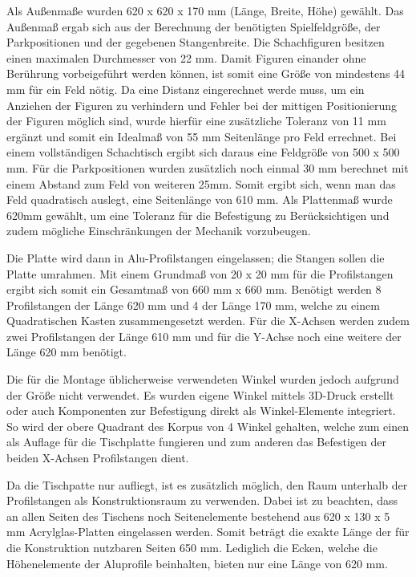 Als Außenmaße wurden 620 x 620 x 170 mm (Länge, Breite, Höhe) gewählt.
Das Außenmaß ergab sich aus der Berechnung der benötigten
Spielfeldgröße, der Parkpositionen und der gegebenen Stangenbreite. Die
Schachfiguren besitzen einen maximalen Durchmesser von 22 mm. Damit
Figuren einander ohne Berührung vorbeigeführt werden können, ist somit
eine Größe von mindestens 44 mm für ein Feld nötig. Da eine Distanz
eingerechnet werde muss, um ein Anziehen der Figuren zu verhindern und
Fehler bei der mittigen Positionierung der Figuren möglich sind, wurde
hierfür eine zusätzliche Toleranz von 11 mm ergänzt und somit ein
Idealmaß von 55 mm Seitenlänge pro Feld errechnet. Bei einem
vollständigen Schachtisch ergibt sich daraus eine Feldgröße von 500 x
500 mm. Für die Parkpositionen wurden zusätzlich noch einmal 30 mm
berechnet mit einem Abstand zum Feld von weiteren 25mm. Somit ergibt
sich, wenn man das Feld quadratisch auslegt, eine Seitenlänge von 610
mm. Als Plattenmaß wurde 620mm gewählt, um eine Toleranz für die
Befestigung zu Berücksichtigen und zudem mögliche Einschränkungen der
Mechanik vorzubeugen.

Die Platte wird dann in Alu-Profilstangen eingelassen; die Stangen
sollen die Platte umrahmen. Mit einem Grundmaß von 20 x 20 mm für die
Profilstangen ergibt sich somit ein Gesamtmaß von 660 mm x 660 mm.
Benötigt werden 8 Profilstangen der Länge 620 mm und 4 der Länge 170 mm,
welche zu einem Quadratischen Kasten zusammengesetzt werden. Für die
X-Achsen werden zudem zwei Profilstangen der Länge 610 mm und für die
Y-Achse noch eine weitere der Länge 620 mm benötigt.

Die für die Montage üblicherweise verwendeten Winkel wurden jedoch
aufgrund der Größe nicht verwendet. Es wurden eigene Winkel mittels
3D-Druck erstellt oder auch Komponenten zur Befestigung direkt als
Winkel-Elemente integriert. So wird der obere Quadrant des Korpus von 4
Winkel gehalten, welche zum einen als Auflage für die Tischplatte
fungieren und zum anderen das Befestigen der beiden X-Achsen
Profilstangen dient.

Da die Tischpatte nur aufliegt, ist es zusätzlich möglich, den Raum
unterhalb der Profilstangen als Konstruktionsraum zu verwenden. Dabei
ist zu beachten, dass an allen Seiten des Tischens noch Seitenelemente
bestehend aus 620 x 130 x 5 mm Acrylglas-Platten eingelassen werden.
Somit beträgt die exakte Länge der für die Konstruktion nutzbaren Seiten
650 mm. Lediglich die Ecken, welche die Höhenelemente der Aluprofile
beinhalten, bieten nur eine Länge von 620 mm.

